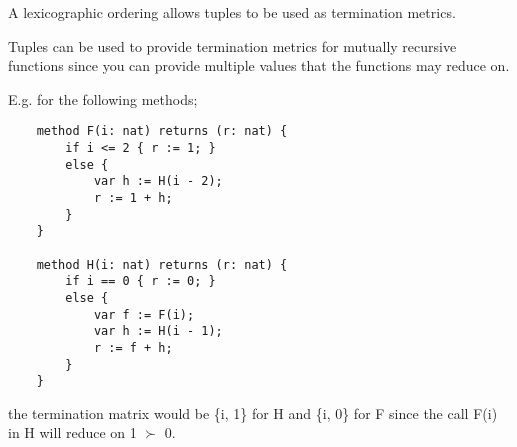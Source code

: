 A lexicographic ordering allows tuples to be used as termination metrics. 

Tuples can be used to provide termination metrics for mutually recursive functions since you can provide multiple values that the functions may reduce on.

E.g. for the following methods;
\begin{verbatim}
    method F(i: nat) returns (r: nat) { 
        if i <= 2 { r := 1; } 
        else {
            var h := H(i - 2);
            r := 1 + h; 
        } 
    } 

    method H(i: nat) returns (r: nat) { 
        if i == 0 { r := 0; } 
        else { 
            var f := F(i); 
            var h := H(i - 1); 
            r := f + h; 
        } 
    }
\end{verbatim}
the termination matrix would be \{i, 1\} for H and \{i, 0\} for F since the call F(i) in H will reduce on 1 $\succ$ 0. 